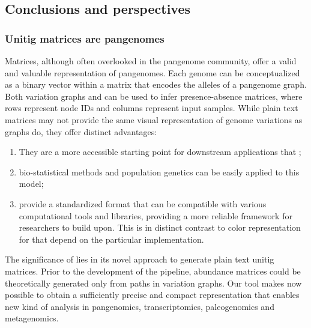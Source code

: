 \subsection{Conclusions and perspectives}
\subsubsection*{Unitig matrices are pangenomes}
Matrices, although often overlooked in the pangenome community, offer a valid and valuable representation of pangenomes. Each genome can be conceptualized as a binary vector within a matrix that encodes the alleles of a pangenome graph. Both variation graphs and \ccdbgs can be used to infer presence-absence matrices, where rows represent node IDs and columns represent input samples. 
While plain text matrices may not provide the same visual representation of genome variations as graphs do, they offer distinct advantages:
\begin{enumerate}
	\item They are a more accessible starting point for downstream applications that \dbgs;
	\item bio-statistical methods and population genetics can be easily applied to this model;
	\item provide a standardized format that can be compatible with various computational tools and libraries, providing a more reliable framework for researchers to build upon. This is in distinct contrast to color representation for \ccdbgs that depend on the particular implementation.
\end{enumerate} 
The significance of \muset lies in its novel approach to generate plain text unitig matrices. Prior to the development of the \muset pipeline, abundance matrices could be theoretically generated only from paths in variation graphs. Our tool makes now possible to obtain a sufficiently precise and compact representation that enables new kind of analysis in pangenomics, transcriptomics, paleogenomics and metagenomics.\\
